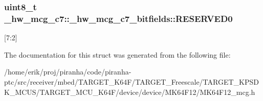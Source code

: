 \subsubsection[{\texorpdfstring{R\+E\+S\+E\+R\+V\+E\+D0}{RESERVED0}}]{\setlength{\rightskip}{0pt plus 5cm}uint8\+\_\+t \+\_\+hw\+\_\+mcg\+\_\+c7\+::\+\_\+hw\+\_\+mcg\+\_\+c7\+\_\+bitfields\+::\+R\+E\+S\+E\+R\+V\+E\+D0}\hypertarget{struct__hw__mcg__c7_1_1__hw__mcg__c7__bitfields_abb769ff148da710365a024b9d735b6ee}{}\label{struct__hw__mcg__c7_1_1__hw__mcg__c7__bitfields_abb769ff148da710365a024b9d735b6ee}
\mbox{[}7\+:2\mbox{]} 

The documentation for this struct was generated from the following file\+:\begin{DoxyCompactItemize}
\item 
/home/erik/proj/piranha/code/piranha-\/ptc/src/receiver/mbed/\+T\+A\+R\+G\+E\+T\+\_\+\+K64\+F/\+T\+A\+R\+G\+E\+T\+\_\+\+Freescale/\+T\+A\+R\+G\+E\+T\+\_\+\+K\+P\+S\+D\+K\+\_\+\+M\+C\+U\+S/\+T\+A\+R\+G\+E\+T\+\_\+\+M\+C\+U\+\_\+\+K64\+F/device/device/\+M\+K64\+F12/M\+K64\+F12\+\_\+mcg.\+h\end{DoxyCompactItemize}

